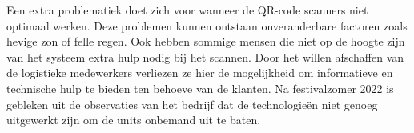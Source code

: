 Een extra problematiek doet zich voor wanneer de QR-code scanners niet optimaal werken. Deze problemen kunnen ontstaan onveranderbare factoren zoals hevige zon of felle regen. Ook hebben sommige mensen die niet op de hoogte zijn van het systeem extra hulp nodig bij het scannen. Door het willen afschaffen van de logistieke medewerkers verliezen ze hier de mogelijkheid om informatieve en technische hulp te bieden ten behoeve van de klanten. Na festivalzomer 2022 is gebleken uit de observaties van het bedrijf dat de technologieën niet genoeg uitgewerkt zijn om de units onbemand uit te baten.

\newpage
\section{}%
\label{sec:onderzoeksvraag}

\begin{comment}
    Wees zo concreet mogelijk bij het formuleren van je onderzoeksvraag. Een onderzoeksvraag is trouwens iets waar nog niemand op dit moment een antwoord heeft (voor zover je kan nagaan). Het opzoeken van bestaande informatie (bv. ``welke tools bestaan er voor deze toepassing?'') is dus geen onderzoeksvraag. Je kan de onderzoeksvraag verder specifiëren in deelvragen. Bv.~als je onderzoek gaat over performantiemetingen, dan  
\end{comment}

\section{}%
\label{sec:onderzoeksdoelstelling}
\begin{comment}
    Wat is het beoogde resultaat van je bachelorproef? Wat zijn de criteria voor succes? Beschrijf die zo concreet mogelijk. Gaat het bv.\ om een proof-of-concept, een prototype, een verslag met aanbevelingen, een vergelijkende studie, enz.
\end{comment}


\section{}%
\label{sec:opzet-bachelorproef}


